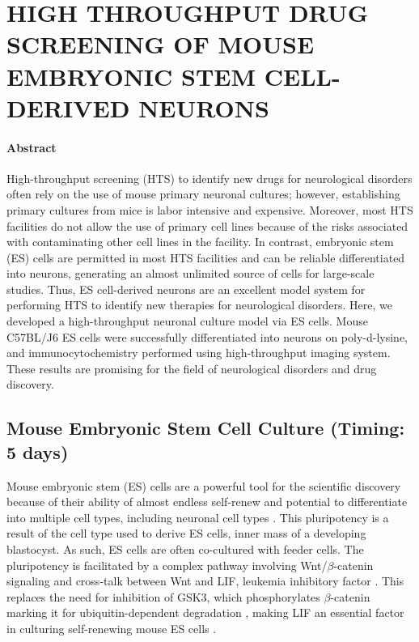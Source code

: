 

\chapter{\uppercase {High throughput drug screening of mouse embryonic stem cell-derived neurons}}

\subsubsection*{Abstract}

High-throughput screening (HTS) to identify new drugs for neurological disorders often rely on the use of mouse primary neuronal cultures; however, establishing primary cultures from mice is labor intensive and expensive.  Moreover, most HTS facilities do not allow the use of primary cell lines because of the risks associated with contaminating other cell lines in the facility. In contrast, embryonic stem (ES) cells are permitted in most HTS facilities and can be reliable differentiated into neurons, generating an almost unlimited source of cells for large-scale studies. Thus, ES cell-derived neurons are an excellent model system for performing HTS to identify new therapies for neurological disorders. Here, we developed a high-throughput neuronal culture model via ES cells. Mouse C57BL/J6 ES cells were successfully differentiated into neurons on poly-d-lysine, and immunocytochemistry performed using high-throughput imaging system. These results are promising for the field of neurological disorders and drug discovery.

\section{Mouse Embryonic Stem Cell Culture (Timing: 5 days)}

Mouse embryonic stem (ES) cells are a powerful tool for the scientific discovery because of their ability of almost endless self-renew and potential to differentiate into multiple cell types, including neuronal cell types \cite{Lunn2011}. This pluripotency is a result of the cell type used to derive ES cells, inner mass of a developing blastocyst. As such, ES cells are often co-cultured with feeder cells. The pluripotency is facilitated by a complex pathway involving Wnt/\( \beta \)-catenin signaling and cross-talk between Wnt and LIF, leukemia inhibitory factor \cite{Hao2006,Ogawa2006}. This replaces the need for inhibition of GSK3, which phosphorylates \( \beta \)-catenin marking it for ubiquitin-dependent degradation \cite{Clevers2006,MacDonald2009}, making LIF an essential factor in culturing self-renewing mouse ES cells \cite{Wray2011,Smith1988,Williams1988}.

